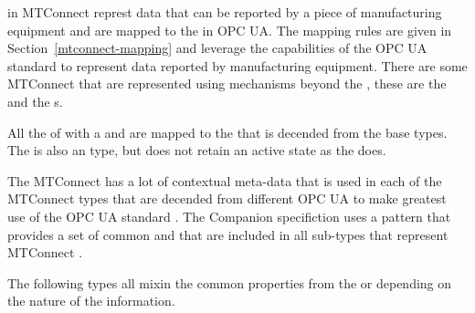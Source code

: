  in MTConnect represt data that can be reported by a piece of manufacturing equipment and are mapped to the  in OPC UA. The mapping rules are given in Section~\ref{mtconnect-mapping} and leverage the capabilities of the OPC UA standard to represent data reported by manufacturing equipment. There are some MTConnect  that are represented using mechanisms beyond the , these are the   and the  s.

All the  of with a   and are mapped to the  that is decended from the  base types. The  is also an  type, but does not retain an active state as the  does.

The MTConnect  has a lot of contextual meta-data that is used in each of the MTConnect types that are decended from different OPC UA  to make greatest use of the OPC UA standard \cite{UAPart8}. The Companion specifiction uses a  pattern that provides a set of common  and  that are included in all sub-types that represent MTConnect .

The following types all mixin the common properties from the  or  depending on the nature of the information. 

